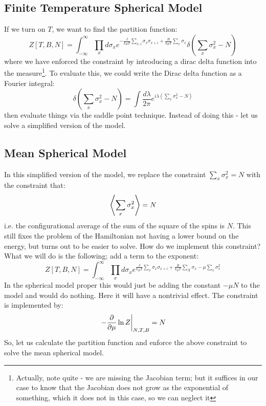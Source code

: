 \subsection{Finite Temperature Spherical Model}
If we turn on $T$, we want to find the partition function:
\begin{equation}
    Z[T, B, N] = \int_{-\infty}^\infty \prod_x d\sigma_x e^{-\frac{J}{k_B T}\sum_{x, i} \sigma_x \sigma_{x  + i} + \frac{B}{k_B T}\sum_x \sigma_x}\delta(\sum_x \sigma_x^2 - N)
\end{equation}
where we have enforced the constraint by introducing a dirac delta function into the measure\footnote{Actually, note quite - we are missing the Jacobian term; but it suffices in our case to know that the Jacobian does not grow as the exponential of something, which it does not in this case, so we can neglect it}. To evaluate this, we could write the Dirac delta function as a Fourier integral:
\begin{equation}
    \delta(\sum_x \sigma_x^2 - N) = \int \frac{d\lambda}{2\pi}e^{i\lambda\left(\sum_x \sigma_x^2 - N\right)}
\end{equation}
then evaluate things via the saddle point technique. Instead of doing this - let us solve a simplified version of the model.

\subsection{Mean Spherical Model}
In this simplified version of the model, we replace the constraint $\sum_x \sigma_x^2 = N$ with the constraint that:
\begin{equation}
    \left< \sum_x \sigma_x^2 \right> = N
\end{equation}
i.e. the configurational average of the sum of the square of the spins is $N$. This still fixes the problem of the Hamiltonian not having a lower bound on the energy, but turns out to be easier to solve. How do we implement this constraint? What we will do is the following; add a term to the exponent:
\begin{equation}
    Z[T, B, N] = \int_{-\infty}^\infty \prod_x d\sigma_x e^{\frac{J}{k_B T}\sum_x \sigma_x \sigma_{x + i} + \frac{B}{k_B T}\sum_X \sigma_x - \mu \sum_x \sigma_x^2}
\end{equation}
In the spherical model proper this would just be adding the constant $-\mu N$ to the model and would do nothing. Here it will have a nontrivial effect. The constraint is implemented by:
\begin{equation}
    \left.-\frac{\partial }{\partial \mu}\ln Z\right|_{N, T, B} = N
\end{equation}
So, let us calculate the partition function and enforce the above constraint to solve the mean spherical model.

